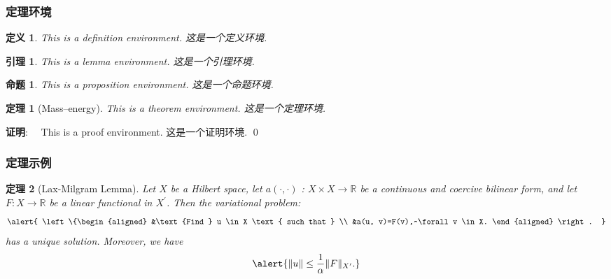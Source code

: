 \documentclass[notheorems,11pt,compress]{beamer}
\numberwithin{figure}{section}
\numberwithin{table}{section}
\numberwithin{equation}{section}
\newtheorem{theorem}{定理}
\numberwithin{theorem}{section}
\newtheorem{definition}{定义}
\numberwithin{definition}{section}
\newtheorem{lemma}{引理}
\numberwithin{lemma}{section}
\newtheorem{proposition}{命题}
\numberwithin{proposition}{section}
\numberwithin{corollary}{section}
\theoremstyle{example}
\renewenvironment{proof}[1][证明]{\textbf{#1}:~~}{\qed\par}
\begin{document}
\begin{frame}
\frametitle{定理环境}
\begin{definition}
This is a definition environment. 这是一个定义环境.
\end{definition}


\begin{lemma}
This is a lemma environment. 这是一个引理环境.
\end{lemma}

\begin{proposition}
This is a proposition environment. 这是一个命题环境.
\end{proposition}

\begin{theorem}[Mass--energy]
This is a theorem environment. 这是一个定理环境.
\end{theorem}

\begin{proof}
  This is a proof environment. 这是一个证明环境.
\end{proof}

\end{frame}


\begin{frame}
\frametitle{定理示例}

\begin{theorem}[Lax-Milgram Lemma]
Let $X$ be a Hilbert space, let $a(\cdot, \cdot)$ : $X \times X \rightarrow \mathbb{R}$ be a continuous and coercive bilinear form, and let $F : X \rightarrow \mathbb{R}$ be a linear functional in $X^{\prime}$. Then the variational problem:
\begin{equation}
  \alert{
  \left\{\begin{aligned}
  &\text {Find } u \in X \text { such that } \\
  &a(u, v)=F(v),~\forall v \in X.
  \end{aligned} \right. }
\end{equation}
has a unique solution. Moreover, we have
\begin{equation}
  \alert{ \|u\| \leq \frac{1}{\alpha}\|F\|_{X^{\prime}}. }
\end{equation}
\end{theorem}

\end{frame}

\end{document}

